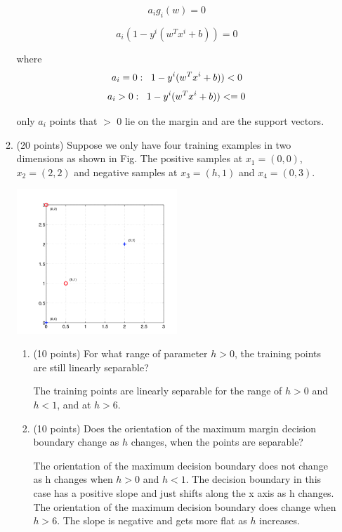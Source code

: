 \documentclass[twoside,10pt]{article}
\begin{document}
\begin{enumerate}
\begin{enumerate}
$$a_ig_i(w)=0 $$

$$a_i(1 - y^i (w^Tx^i + b)) = 0$$

where $$a_i = 0: \hspace{2 mm} 1 - y^i (w^Tx^i + b)) < 0$$
$$a_i > 0: \hspace{2 mm} 1 - y^i (w^Tx^i + b)) <= 0$$

only $a_i$ points that $>$ 0 lie on the margin and are the support vectors.

\item (20 points) Suppose we only have four training examples in two dimensions as shown in Fig. The positive samples at $x_1 = (0, 0)$, $x_2 = (2, 2)$ and negative samples at $x_3 = (h, 1)$ and $x_4 = (0, 3)$. 
%
\begin{center}
\includegraphics[width = 0.5\textwidth]{svm}
\end{center}

\begin{enumerate}
\item (10 points) For what range of parameter $h > 0$, the training points are still linearly separable?

\vspace{5 mm}
The training points are linearly separable for the range of $h > 0$ and $h < 1$, and at $h > 6$.
\vspace{5 mm}

\item (10 points) Does the orientation of the maximum margin decision boundary change as $h$ changes, when the points are separable?

\vspace{5 mm}
The orientation of the maximum decision boundary does not change as h changes when $h > 0$ and $h < 1$.  The decision boundary in this case has a positive slope and just shifts along the x axis as h changes. The orientation of the maximum decision boundary does change when $h > 6$. The slope is negative and gets more flat as $h$ increases.
\vspace{5 mm}
\end{enumerate}
\end{enumerate}




\end{enumerate}
\end{document}

